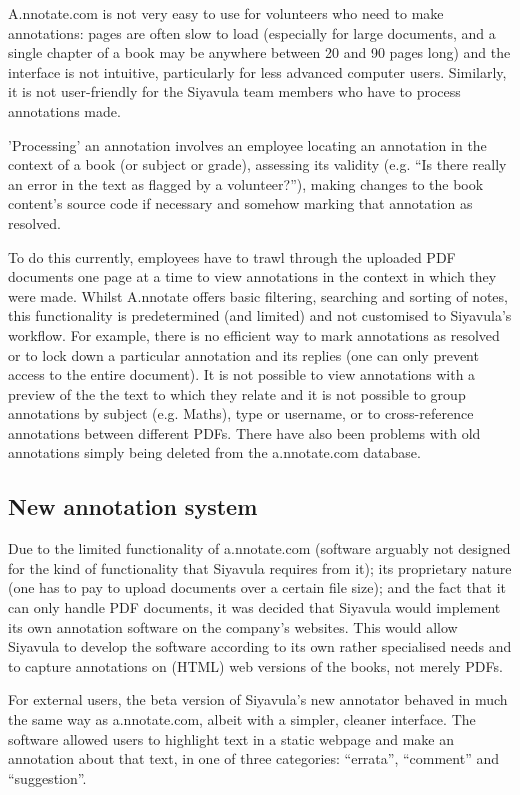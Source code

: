 A.nnotate.com is not very easy to use for volunteers who need to make annotations: pages are often slow to load (especially for large documents, and a single chapter of a book may be anywhere between 20 and 90 pages long) and the interface is not intuitive, particularly for less advanced computer users. Similarly, it is not user-friendly for the Siyavula team members who have to process annotations made. 

'Processing' an annotation involves an employee locating an annotation in the context of a book (or subject or grade), assessing its validity (e.g. ``Is there really an error in the text as flagged by a volunteer?''), making changes to the book content's source code if necessary and somehow marking that annotation as resolved.

To do this currently, employees have to trawl through the uploaded PDF documents one page at a time to view annotations in the context in which they were made. Whilst A.nnotate offers basic filtering, searching and sorting of notes, this functionality is predetermined (and limited) and not customised to Siyavula's workflow. For example, there is no efficient way to mark annotations as resolved or to lock down a particular annotation and its replies (one can only prevent access to the entire document). It is not possible to view annotations with a preview of the the text to which they relate and it is not possible to group annotations by subject (e.g. Maths), type or username, or to cross-reference annotations between different PDFs. There have also been problems with old annotations simply being deleted from the a.nnotate.com database.  


\subsection{New annotation system}

Due to the limited functionality of a.nnotate.com (software arguably not designed for the kind of functionality that Siyavula requires from it); its proprietary nature (one has to pay to upload documents over a certain file size); and the fact that it can only handle PDF documents, it was decided that Siyavula would implement its own annotation software on the company's websites. This would allow Siyavula to develop the software according to its own rather specialised needs and to capture annotations on (HTML) web versions of the books, not merely PDFs.  

For external users, the beta version of Siyavula's new annotator behaved in much the same way as a.nnotate.com, albeit with a simpler, cleaner interface. The software allowed users to highlight text in a static webpage and make an annotation about that text, in one of three categories: ``errata'', ``comment'' and ``suggestion''. 

